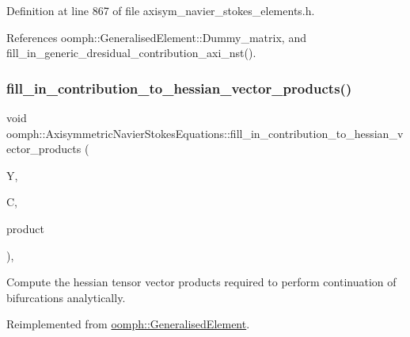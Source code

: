 Definition at line 867 of file axisym\+\_\+navier\+\_\+stokes\+\_\+elements.\+h.



References oomph\+::\+Generalised\+Element\+::\+Dummy\+\_\+matrix, and fill\+\_\+in\+\_\+generic\+\_\+dresidual\+\_\+contribution\+\_\+axi\+\_\+nst().

\mbox{\label{classoomph_1_1AxisymmetricNavierStokesEquations_a295dab32c432e6f2597db7aa78c306d9}} 
\subsubsection{\texorpdfstring{fill\+\_\+in\+\_\+contribution\+\_\+to\+\_\+hessian\+\_\+vector\+\_\+products()}{fill\_in\_contribution\_to\_hessian\_vector\_products()}}
{\footnotesize\ttfamily void oomph\+::\+Axisymmetric\+Navier\+Stokes\+Equations\+::fill\+\_\+in\+\_\+contribution\+\_\+to\+\_\+hessian\+\_\+vector\+\_\+products (\begin{DoxyParamCaption}\item[{\hyperlink{classoomph_1_1Vector}{Vector}$<$ double $>$ const \&}]{Y,  }\item[{\hyperlink{classoomph_1_1DenseMatrix}{Dense\+Matrix}$<$ double $>$ const \&}]{C,  }\item[{\hyperlink{classoomph_1_1DenseMatrix}{Dense\+Matrix}$<$ double $>$ \&}]{product }\end{DoxyParamCaption})\hspace{0.3cm}{\ttfamily [protected]}, {\ttfamily [virtual]}}



Compute the hessian tensor vector products required to perform continuation of bifurcations analytically. 



Reimplemented from \hyperlink{classoomph_1_1GeneralisedElement_a94e118d65f31ce404963509e462b2d0e}{oomph\+::\+Generalised\+Element}.



